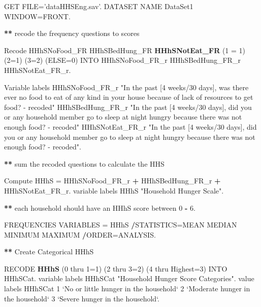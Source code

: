 \documentclass[
]{book}
\newenvironment{Shaded}{\begin{snugshade}}{\end{snugshade}}
\newcommand{\DataTypeTok}[1]{\textcolor[rgb]{0.13,0.29,0.53}{#1}}
\newcommand{\DecValTok}[1]{\textcolor[rgb]{0.00,0.00,0.81}{#1}}
\newcommand{\FloatTok}[1]{\textcolor[rgb]{0.00,0.00,0.81}{#1}}
\newcommand{\KeywordTok}[1]{\textcolor[rgb]{0.13,0.29,0.53}{\textbf{#1}}}
\newcommand{\NormalTok}[1]{#1}
\newcommand{\OperatorTok}[1]{\textcolor[rgb]{0.81,0.36,0.00}{\textbf{#1}}}
\newcommand{\StringTok}[1]{\textcolor[rgb]{0.31,0.60,0.02}{#1}}
\begin{document}
\begin{Shaded}
\begin{Highlighting}[]
\NormalTok{GET  FILE=}\StringTok{'dataHHSEng.sav'}\NormalTok{.}
\NormalTok{DATASET NAME DataSet1 WINDOW=FRONT.}

\OperatorTok{**}\StringTok{ }\NormalTok{recode the frequency questions to scores}

\NormalTok{Recode HHhSNoFood_FR HHhSBedHung_FR }\KeywordTok{HHhSNotEat_FR}\NormalTok{ (}\DecValTok{1}\NormalTok{ =}\StringTok{ }\DecValTok{1}\NormalTok{) (}\DecValTok{2}\NormalTok{=}\DecValTok{1}\NormalTok{) (}\DecValTok{3}\NormalTok{=}\DecValTok{2}\NormalTok{) (}\DataTypeTok{ELSE=}\DecValTok{0}\NormalTok{) INTO HHhSNoFood_FR_r HHhSBedHung_FR_r HHhSNotEat_FR_r.}

\NormalTok{Variable labels HHhSNoFood_FR_r }\StringTok{"In the past [4 weeks/30 days], was there ever no food to eat of any kind in your house because of lack of resources to get food? - recoded"}
\NormalTok{HHhSBedHung_FR_r }\StringTok{"In the past [4 weeks/30 days], did you or any household member go to sleep at night hungry because there was not enough food? - recoded"}
\NormalTok{HHhSNotEat_FR_r }\StringTok{"In the past [4 weeks/30 days], did you or any household member go to sleep at night hungry because there was not enough food? - recoded"}\NormalTok{.}

\OperatorTok{**}\StringTok{ }\NormalTok{sum the recoded questions to calculate the HHS}

\NormalTok{Compute HHhS =}\StringTok{ }\NormalTok{HHhSNoFood_FR_r }\OperatorTok{+}\StringTok{ }\NormalTok{HHhSBedHung_FR_r }\OperatorTok{+}\StringTok{ }\NormalTok{HHhSNotEat_FR_r.}
\NormalTok{variable labels HHhS }\StringTok{"Household Hunger Scale"}\NormalTok{.}

\OperatorTok{**}\StringTok{ }\NormalTok{each household should have an HHhS score between }\DecValTok{0} \OperatorTok{-}\StringTok{ }\FloatTok{6.}

\NormalTok{FREQUENCIES VARIABLES =}\StringTok{ }\NormalTok{HHhS}
\OperatorTok{/}\NormalTok{STATISTICS=MEAN MEDIAN MINIMUM MAXIMUM}
\OperatorTok{/}\NormalTok{ORDER=ANALYSIS.}

\OperatorTok{**}\StringTok{ }\NormalTok{Create Categorical HHhS}

\NormalTok{RECODE }\KeywordTok{HHhS}\NormalTok{ (}\DecValTok{0}\NormalTok{ thru }\DecValTok{1}\NormalTok{=}\DecValTok{1}\NormalTok{) (}\DecValTok{2}\NormalTok{ thru }\DecValTok{3}\NormalTok{=}\DecValTok{2}\NormalTok{) (}\DecValTok{4}\NormalTok{ thru }\DataTypeTok{Highest=}\DecValTok{3}\NormalTok{) INTO HHhSCat.}
\NormalTok{variable labels HHhSCat }\StringTok{"Household Hunger Score Categories"}\NormalTok{.}
\NormalTok{value labels HHhSCat }
\DecValTok{1} \StringTok{`}\DataTypeTok{No or little hunger in the household}\StringTok{`}
\DecValTok{2} \StringTok{`}\DataTypeTok{Moderate hunger in the household}\StringTok{`}
\DecValTok{3} \StringTok{`}\DataTypeTok{Severe hunger in the household}\StringTok{`}\NormalTok{.}


\end{Highlighting}
\end{Shaded}
\end{document}
